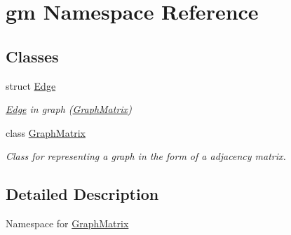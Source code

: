 \hypertarget{namespacegm}{}\section{gm Namespace Reference}
\label{namespacegm}
\subsection*{Classes}
\begin{DoxyCompactItemize}
\item 
struct \mbox{\hyperlink{structgm_1_1_edge}{Edge}}
\begin{DoxyCompactList}\small\item\em \mbox{\hyperlink{structgm_1_1_edge}{Edge}} in graph (\mbox{\hyperlink{classgm_1_1_graph_matrix}{Graph\+Matrix}}) \end{DoxyCompactList}\item 
class \mbox{\hyperlink{classgm_1_1_graph_matrix}{Graph\+Matrix}}
\begin{DoxyCompactList}\small\item\em Class for representing a graph in the form of a adjacency matrix. \end{DoxyCompactList}\end{DoxyCompactItemize}


\subsection{Detailed Description}
Namespace for \mbox{\hyperlink{classgm_1_1_graph_matrix}{Graph\+Matrix}} 